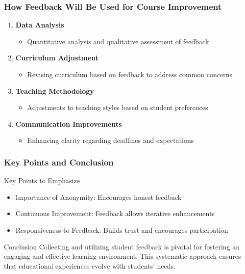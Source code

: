 \documentclass[aspectratio=169]{beamer}
\begin{document}
\begin{frame}[fragile]
    \frametitle{How Feedback Will Be Used for Course Improvement}
    
    \begin{enumerate}
        \item \textbf{Data Analysis}
        \begin{itemize}
            \item Quantitative analysis and qualitative assessment of feedback
        \end{itemize}
        
        \item \textbf{Curriculum Adjustment}
        \begin{itemize}
            \item Revising curriculum based on feedback to address common concerns
        \end{itemize}

        \item \textbf{Teaching Methodology}
        \begin{itemize}
            \item Adjustments to teaching styles based on student preferences
        \end{itemize}

        \item \textbf{Communication Improvements}
        \begin{itemize}
            \item Enhancing clarity regarding deadlines and expectations
        \end{itemize}
    \end{enumerate}
\end{frame}

\begin{frame}[fragile]
    \frametitle{Key Points and Conclusion}
    
    \begin{block}{Key Points to Emphasize}
        \begin{itemize}
            \item Importance of Anonymity: Encourages honest feedback
            \item Continuous Improvement: Feedback allows iterative enhancements
            \item Responsiveness to Feedback: Builds trust and encourages participation
        \end{itemize}
    \end{block}

    \begin{block}{Conclusion}
        Collecting and utilizing student feedback is pivotal for fostering an engaging and effective learning environment. This systematic approach ensures that educational experiences evolve with students' needs.
    \end{block}
\end{frame}
\end{document}
